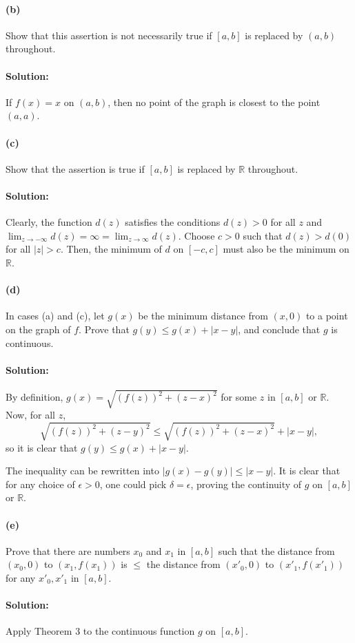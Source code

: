 \documentclass{article}
\begin{document}
\paragraph{(b)} Show that this assertion is not necessarily true if $[a, b]$
is replaced by $(a, b)$ throughout.

\paragraph{Solution:} If $f(x) = x$ on $(a, b)$, then no point of the graph is
closest to the point $(a, a)$.

\paragraph{(c)} Show that the assertion is true if $[a, b]$ is replaced by
$\mathbb{R}$ throughout.

\paragraph{Solution:} Clearly, the function $d(z)$ satisfies the conditions
$d(z) > 0$ for all $z$ and $\lim_{z \rightarrow -\infty}d(z) = \infty = \lim_{z
\rightarrow \infty}d(z)$. Choose $c > 0$ such that $d(z) > d(0)$ for all $|z| >
c$. Then, the minimum of $d$ on $[-c, c]$ must also be the minimum on
$\mathbb{R}$.

\paragraph{(d)} In cases (a) and (c), let $g(x)$ be the minimum distance from
$(x, 0)$ to a point on the graph of $f$. Prove that $g(y) \leq g(x) + |x - y|$,
and conclude that $g$ is continuous.

\paragraph{Solution:} By definition, $g(x) = \sqrt{(f(z))^2 + (z - x)^2}$ for
some $z$ in $[a, b]$ or $\mathbb{R}$. Now, for all $z$, \begin{equation*}
  \sqrt{(f(z))^2 + (z - y)^2} \leq \sqrt{(f(z))^2 + (z - x)^2} + |x - y|,
\end{equation*} so it is clear that $g(y) \leq g(x) + |x - y|$.

The inequality can be rewritten into $|g(x) - g(y)| \leq |x - y|$. It is clear
that for any choice of $\epsilon > 0$, one could pick $\delta = \epsilon$,
proving the continuity of $g$ on $[a, b]$ or $\mathbb{R}$.

\paragraph{(e)} Prove that there are numbers $x_0$ and $x_1$ in $[a, b]$ such
that the distance from $(x_0, 0)$ to $(x_1, f(x_1))$ is $\leq$ the distance
from $(x'_0, 0)$ to $(x'_1, f(x'_1))$ for any $x'_0, x'_1$ in $[a, b]$.

\paragraph{Solution:} Apply Theorem 3 to the continuous function $g$ on $[a,
b]$.
\end{document}
